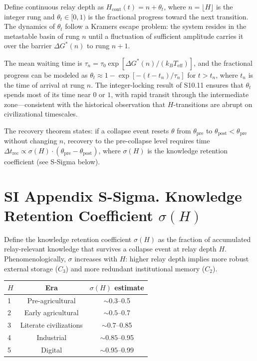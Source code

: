 \documentclass[11pt]{article}
\begin{document}
Define continuous relay depth as $H_{\mathrm{cont}}(t) = n + \theta_t$, where $n=\lfloor H \rfloor$ is the integer rung and $\theta_t \in [0,1)$ is the fractional progress toward the next transition.
The dynamics of $\theta_t$ follow a Kramers escape problem: the system resides in the metastable basin of rung $n$ until a fluctuation of sufficient amplitude carries it over the barrier $\Delta G^*(n)$ to rung $n+1$.

The mean waiting time is $\tau_n = \tau_0 \exp[\Delta G^*(n)/(k_B T_{\mathrm{eff}})]$, and the fractional progress can be modeled as $\theta_t \approx 1 - \exp[-(t - t_n)/\tau_n]$ for $t > t_n$, where $t_n$ is the time of arrival at rung $n$.
The integer-locking result of S10.11 ensures that $\theta_t$ spends most of its time near $0$ or $1$, with rapid transit through the intermediate zone---consistent with the historical observation that $H$-transitions are abrupt on civilizational timescales.

The recovery theorem states: if a collapse event resets $\theta$ from $\theta_{\mathrm{pre}}$ to $\theta_{\mathrm{post}} < \theta_{\mathrm{pre}}$ without changing $n$, recovery to the pre-collapse level requires time $\Delta t_{\mathrm{rec}} \propto \sigma(H) \cdot (\theta_{\mathrm{pre}} - \theta_{\mathrm{post}})$, where $\sigma(H)$ is the knowledge retention coefficient (see S-Sigma below).


\section*{SI Appendix S-Sigma. Knowledge Retention Coefficient $\sigma(H)$}

Define the knowledge retention coefficient $\sigma(H)$ as the fraction of accumulated relay-relevant knowledge that survives a collapse event at relay depth $H$.
Phenomenologically, $\sigma$ increases with $H$: higher relay depth implies more robust external storage ($C_3$) and more redundant institutional memory ($C_2$).

\begin{center}
\begin{tabular}{lcc}
\toprule
$H$ & Era & $\sigma(H)$ estimate \\
\midrule
1 & Pre-agricultural & $\sim 0.3$--0.5 \\
2 & Early agricultural & $\sim 0.5$--0.7 \\
3 & Literate civilizations & $\sim 0.7$--0.85 \\
4 & Industrial & $\sim 0.85$--0.95 \\
5 & Digital & $\sim 0.95$--0.99 \\
\bottomrule
\end{tabular}
\end{center}
\end{document}
